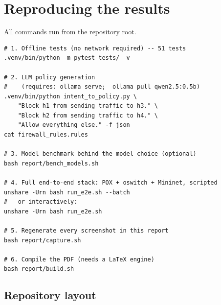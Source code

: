 \documentclass[11pt,a4paper]{article}
\begin{document}
\section{Reproducing the results}

All commands run from the repository root.

\begin{lstlisting}[style=sdnconsole]
# 1. Offline tests (no network required) -- 51 tests
.venv/bin/python -m pytest tests/ -v

# 2. LLM policy generation
#    (requires: ollama serve;  ollama pull qwen2.5:0.5b)
.venv/bin/python intent_to_policy.py \
    "Block h1 from sending traffic to h3." \
    "Block h2 from sending traffic to h4." \
    "Allow everything else." -f json
cat firewall_rules.rules

# 3. Model benchmark behind the model choice (optional)
bash report/bench_models.sh

# 4. Full end-to-end stack: POX + oswitch + Mininet, scripted
unshare -Urn bash run_e2e.sh --batch
#   or interactively:
unshare -Urn bash run_e2e.sh

# 5. Regenerate every screenshot in this report
bash report/capture.sh

# 6. Compile the PDF (needs a LaTeX engine)
bash report/build.sh
\end{lstlisting}

\subsection*{Repository layout}
\end{document}
